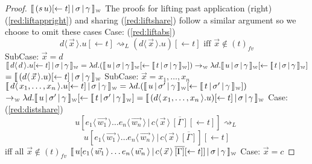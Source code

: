 \documentclass[a4paper,UKenglish,cleveref, autoref]{lipics-v2019}
\newcommand{\fv}[1]{(#1)_{fv}}
\newcommand{\abs}[2]{\lambda #1 . #2}
\newcommand{\app}[2]{#1 \, #2}
\newcommand{\fake}[3]{#1 \langle \, #2 \, \rangle . #3}
\newcommand{\share}[3]{#1 [#2 \leftarrow #3]}
\newcommand{\dist}[5]{#1 [ #2 \, \vert \, \fakedist{#4}{#5} \, #3 ]}
\newcommand{\fakedist}[2]{#1 \langle \, #2 \, \rangle}
\newcommand{\weaksymbol}{\mbox{\tiny $\mathcal{W}$}}
\newcommand{\readweakwmap}[3]{\llbracket \, #1 \, \vert \, #2 \, \vert \, #3  \, \rrbracket_{\weaksymbol} }
\begin{document}
\begin{proof}
$\readweakwmap{(\app{s}{u}) \share{}{}{t}}{\sigma}{\gamma}$
\newline
\newline
\newline
The proofs for lifting past application (right) (\ref{red:liftappright}) and sharing (\ref{red:liftshare}) follow a similar argument so we choose to omit these cases
\newline
\newline
Case: (\ref{red:liftabs})
$$\fake{d}{\vec{x}}{u  \share{}{}{t}} \rightsquigarrow_{L} (\fake{d}{\vec{x}}{u})  \share{}{}{t} \text{ iff $\vec{x} \not\in \fv{t}$}$$
\indent SubCase: $\vec{x} = d$
\newline
$\readweakwmap{\fake{d}{d}{u  \share{}{}{t}}}{\sigma}{\gamma} = \abs{d}{( \readweakwmap{u}{\sigma}{\gamma} \share{}{}{\readweakwmap{t}{\sigma}{\gamma}})} \rightarrow_{\weaksymbol} \abs{d}{ \readweakwmap{u}{\sigma}{\gamma}} \share{}{}{\readweakwmap{t}{\sigma}{\gamma}}$
\newline
$= \readweakwmap{(\fake{d}{\vec{x}}{u})  \share{}{}{t}}{\sigma}{\gamma}$
\newline
\newline
\indent SubCase: $\vec{x} = x_{1}, \dots, x_{n}$
\newline
$\readweakwmap{\fake{d}{x_{1}, \dots, x_{n}}{u  \share{}{}{t}}}{\sigma}{\gamma} = \abs{d}{( \readweakwmap{u}{\sigma'}{\gamma} \share{}{}{\readweakwmap{t}{\sigma'}{\gamma}} )}$
\newline
$\rightarrow_{\weaksymbol} \abs{d}{ \readweakwmap{u}{\sigma'}{\gamma}} \share{}{}{\readweakwmap{t}{\sigma'}{\gamma}} = \readweakwmap{(\fake{d}{x_{1}, \dots, x_{n}}{u}) \share{}{}{t}}{\sigma}{\gamma}$
\newline
\newline
Case: (\ref{red:distshare})
$$\dist{u}{\fakedist{e_{1}}{\vec{w_{1}}} \dots \fakedist{e_{n}}{\vec{w_{n}}}}{\overline{[\Gamma]} \share{}{}{t}}{c}{\vec{x}} \rightsquigarrow_{L}$$
$$\dist{u}{\fakedist{e_{1}}{\vec{w_{1}}} \dots \fakedist{e_{n}}{\vec{w_{n}}}}{\overline{[\Gamma]}}{c}{\vec{x}} \share{}{}{t}$$
iff all $\vec{x} \not\in \fv{t}$
\newline
\newline
$\readweakwmap{\dist{u}{\fakedist{e_{1}}{\vec{w_{1}}} \dots \fakedist{e_{n}}{\vec{w_{n}}}}{\overline{[\Gamma]} \share{}{}{t}}{c}{\vec{x}}}{\sigma}{\gamma}$
\newline
\indent Case: $\vec{x} = c$

\end{proof}
\end{document}
